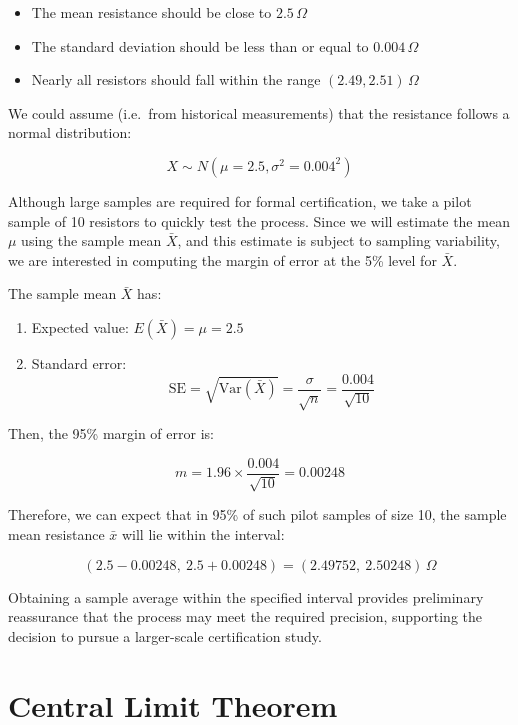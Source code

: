 \documentclass[
]{book}
\providecommand{\tightlist}{%
  \setlength{\itemsep}{0pt}\setlength{\parskip}{0pt}}
\begin{document}
\begin{itemize}
\tightlist
\item
  The mean resistance should be close to \(2.5\,\Omega\)
\item
  The standard deviation should be less than or equal to \(0.004\,\Omega\)
\item
  Nearly all resistors should fall within the range \((2.49, 2.51)\,\Omega\)
\end{itemize}

We could assume (i.e.~from historical measurements) that the resistance follows a normal distribution:

\[
X \sim N(\mu = 2.5, \sigma^2 = 0.004^2)
\]

Although large samples are required for formal certification, we take a pilot sample of 10 resistors to quickly test the process. Since we will estimate the mean \(\mu\) using the sample mean \(\bar{X}\), and this estimate is subject to sampling variability, we are interested in computing the margin of error at the 5\% level for \(\bar{X}\).

The sample mean \(\bar{X}\) has:

\begin{enumerate}
\def\labelenumi{\arabic{enumi}.}
\tightlist
\item
  Expected value: \(E(\bar{X}) = \mu = 2.5\)
\item
  Standard error:
  \[
  \text{SE} = \sqrt{\text{Var}(\bar{X})} = \frac{\sigma}{\sqrt{n}} = \frac{0.004}{\sqrt{10}}
  \]
\end{enumerate}

Then, the 95\% margin of error is:

\[
m = 1.96 \times \frac{0.004}{\sqrt{10}} = 0.00248
\]

Therefore, we can expect that in 95\% of such pilot samples of size 10, the sample mean resistance \(\bar{x}\) will lie within the interval:

\[
(2.5 - 0.00248,\ 2.5 + 0.00248) = (2.49752,\ 2.50248)\,\Omega
\]

Obtaining a sample average within the specified interval provides preliminary reassurance that the process may meet the required precision, supporting the decision to pursue a larger-scale certification study.

\hypertarget{central-limit-theorem-1}{%
\section{Central Limit Theorem}\label{central-limit-theorem-1}}
\end{document}

